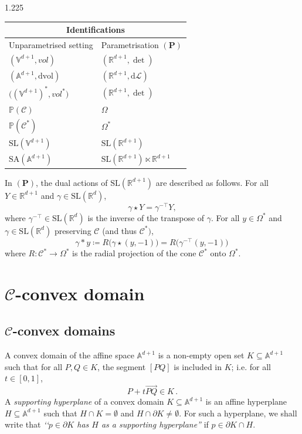 \documentclass[reqno, a4paper]{amsart}
\numberwithin{equation}{section}
\numberwithin{figure}{section}
\theoremstyle{definition}
\theoremstyle{remark}
\newcommand{\R}{\mathbb{R}} %
\newcommand{\V}{\mathbb{V}} %
\newcommand{\A}{\mathbb{A}} %
\renewcommand{\P}{\mathbb{P}} %
\newcommand{\SL}{\mathrm{SL}} %
\newcommand{\SA}{\mathrm{SA}} %
\newcommand{\dif}{\mathrm{d}} %
\newcommand{\C}{\mathcal{C}} %
\newcommand{\linvol}{\mathit{vol}} %
\newcommand{\dvol}{\dif \mathrm{vol}} %
\newcommand{\bp}[1]{{\bigl( {#1} \bigr)}} %
\begin{document}
\begin{spacing}{1.225}
\medskip

\begin{center}
\begin{tabular}{|p{5.5cm} | p{5.5cm}|}
\hline
\multicolumn{2}{|c|}{Identifications}\\
\hline \hline
Unparametrised setting & Parametrisation $(\mathbf{P})$ \\
\hline
$(\V^{d+1}, \linvol)$ & $(\R^{d+1},\det)$ \\
$(\A^{d+1},\dvol)$ & $(\R^{d+1},\dif \mathcal{L})$ \\
$\bp{(\V^{d+1})^*,\linvol^*}$ & $(\R^{d+1},\det)$\\
$\P(\C)$ & $\Omega$ \\
$\P(\C^*)$ & $\Omega^*$ \\
$\SL(\V^{d+1})$ & $\SL(\R^{d+1})$ \\
$\SA(\A^{d+1})$ & $\SL(\R^{d+1})\ltimes \R^{d+1}$\\
\hline
\end{tabular}
\end{center} 

\medskip

In $(\mathbf{P})$, the dual actions of $\SL(\R^{d+1})$ are described as follows. For all $Y \in \R^{d+1}$ and $\gamma \in \SL(\R^{d})$,
\begin{equation*}
 \gamma \star Y = \gamma^{-\top} Y,
\end{equation*}
where $\gamma^{-\top} \in \SL(\R^{d})$ is the inverse of the transpose of $\gamma$. For all $y \in \Omega^*$ and $\gamma \in \SL(\R^{d})$ preserving $\C$ (and thus $\C^*)$,
\begin{equation*}
\gamma * y \coloneqq R\bp{\gamma \star (y,-1)}  = R\bp{\gamma^{-\top}(y,-1)}\, 
\end{equation*}
where $R : \C^*\to\Omega^*$ is the radial projection of the cone $\C^*$ onto $\Omega^*$. 

\section{\texorpdfstring{$\C$-convex domain}{C-convex domains}}
\label{sec C-convex domains}



\subsection{\texorpdfstring{$\C$-convex domains}{C-convex domains}}
\label{subsec C-convex domain}

A convex domain of the affine space $\A^{d+1}$ is a non-empty open set $K \subseteq \A^{d+1}$ such that for all $P,Q \in K$, the segment $[PQ]$ is included in $K$; i.e. for all $t \in [0,1]$,
\begin{equation*}
 P+ t \overrightarrow{PQ} \in K \, .
\end{equation*}
A \emph{supporting hyperplane} of a convex domain $K \subseteq \A^{d+1}$ is an affine hyperplane $H \subseteq \A^{d+1}$ such that $H \cap K = \emptyset$ and $H \cap \partial K \neq \emptyset$. For such a hyperplane, we shall write that \emph{‘‘$p \in \partial K$ has $H$ as a supporting hyperplane''} if $p \in \partial K \cap H$.


\end{spacing}
\end{document}

